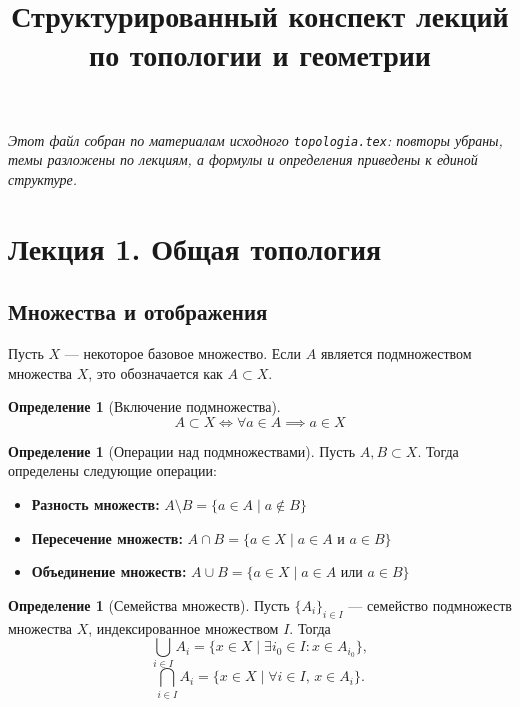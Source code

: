 \documentclass[12pt,a4paper]{article}
\theoremstyle{definition}
\newtheorem{definition}[theorem]{Определение}
\begin{document}
\title{\textbf{Структурированный конспект лекций по топологии и геометрии}}
\author{}
\date{}
\maketitle

\textit{Этот файл собран по материалам исходного \texttt{topologia.tex}: повторы убраны, темы разложены по лекциям, а формулы и определения приведены к единой структуре.}

\tableofcontents
\newpage

\section{Лекция 1. Общая топология}

\subsection{Множества и отображения}

Пусть $X$ --- некоторое базовое множество. Если $A$ является подмножеством множества $X$, это обозначается как $A \subset X$.

\begin{definition}[Включение подмножества]
$$A \subset X \iff \forall a \in A \implies a \in X$$
\end{definition}

\begin{definition}[Операции над подмножествами]
Пусть $A, B \subset X$. Тогда определены следующие операции:
\begin{itemize}
    \item \textbf{Разность множеств:} $A \setminus B = \{a \in A \mid a \notin B\}$
    \item \textbf{Пересечение множеств:} $A \cap B = \{a \in X \mid a \in A \text{ и } a \in B\}$
    \item \textbf{Объединение множеств:} $A \cup B = \{a \in X \mid a \in A \text{ или } a \in B\}$
\end{itemize}
\end{definition}

\begin{definition}[Семейства множеств]
Пусть $\{A_i\}_{i \in I}$ --- семейство подмножеств множества $X$, индексированное множеством $I$.
Тогда
$$\bigcup_{i \in I} A_i = \{x \in X \mid \exists i_0 \in I : x \in A_{i_0}\},$$
$$\bigcap_{i \in I} A_i = \{x \in X \mid \forall i \in I,\, x \in A_i\}.$$
\end{definition}
\end{document}
